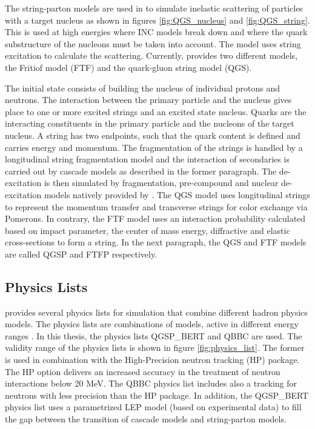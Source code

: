 The string-parton models \cite{Folger2003} are used in \geant to simulate inelastic scattering of particles with a target nucleus as shown in figures \ref{fig:QGS_nucleus} and \ref{fig:QGS_string}. This is used at high energies where INC models break down and where the quark substructure of the nucleons must be taken into account. The model uses string excitation to calculate the scattering. Currently, \geant provides two different models, the Fritiof model (FTF) and the quark-gluon string model (QGS).

The initial state consists of building the nucleus of individual protons and neutrons. The interaction between the primary particle and the nucleus gives place to one or more excited strings and an excited state nucleus. Quarks are the interacting constituents in the primary particle and the nucleons of the target nucleus. A string has two endpoints, such that the quark content is defined and carries energy and momentum. The fragmentation of the strings is handled by a longitudinal string fragmentation model and the interaction of secondaries is carried out by cascade models as described in the former paragraph. The de-excitation is then simulated by fragmentation, pre-compound and nuclear de-excitation models natively provided by \geant. The QGS model uses longitudinal strings to represent the momentum transfer and transverse strings for color exchange via Pomerons. In contrary, the FTF model uses an interaction probability calculated based on impact parameter, the center of mass energy, diffractive and elastic cross-sections to form a string. In the next paragraph, the QGS and FTF models are called QGSP and FTFP respectively.

\subsection{\geant Physics Lists}

\geant provides several physics lists for simulation that combine different hadron physics models. The physics lists are combinations of models, active in different energy ranges \cite{Geant4PhysicsLists:IEEE}. In this thesis, the physics lists QGSP\_BERT and QBBC are used. The validity range of the physics lists is shown in figure \ref{fig:physics_list}. The former is used in combination with the High-Precision neutron tracking (HP) package. The HP option delivers an increased accuracy in the treatment of neutron interactions below 20 MeV. The QBBC physics list includes also a tracking for neutrons with less precision than the HP package.
In addition, the QGSP\_BERT physics list uses a parametrized LEP model (based on experimental data) to fill the gap between the transition of cascade models and string-parton models.

